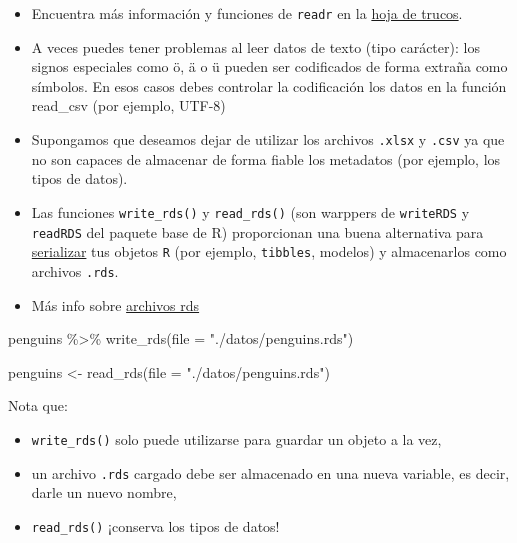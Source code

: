 \documentclass[
  letterpaper,
  DIV=11,
  numbers=noendperiod]{scrreprt}
\newenvironment{Shaded}{\begin{snugshade}}{\end{snugshade}}
\newcommand{\AttributeTok}[1]{\textcolor[rgb]{0.40,0.45,0.13}{#1}}
\newcommand{\FunctionTok}[1]{\textcolor[rgb]{0.28,0.35,0.67}{#1}}
\newcommand{\NormalTok}[1]{\textcolor[rgb]{0.00,0.23,0.31}{#1}}
\newcommand{\OtherTok}[1]{\textcolor[rgb]{0.00,0.23,0.31}{#1}}
\newcommand{\SpecialCharTok}[1]{\textcolor[rgb]{0.37,0.37,0.37}{#1}}
\newcommand{\StringTok}[1]{\textcolor[rgb]{0.13,0.47,0.30}{#1}}
\begin{document}
\begin{itemize}
\item
  Encuentra más información y funciones de \texttt{readr} en la
  \href{https://raw.githubusercontent.com/rstudio/cheatsheets/master/data-import.pdf}{hoja
  de trucos}.
\item
  A veces puedes tener problemas al leer datos de texto (tipo carácter):
  los signos especiales como ö, ä o ü pueden ser codificados de forma
  extraña como símbolos. En esos casos debes controlar la codificación
  los datos en la función read\_csv (por ejemplo, UTF-8)
\item
  Supongamos que deseamos dejar de utilizar los archivos \texttt{.xlsx}
  y \texttt{.csv} ya que no son capaces de almacenar de forma fiable los
  metadatos (por ejemplo, los tipos de datos).
\item
  Las funciones \texttt{write\_rds()} y \texttt{read\_rds()} (son
  warppers de \texttt{writeRDS} y \texttt{readRDS} del paquete base de
  R) proporcionan una buena alternativa para
  \href{https://en.wikipedia.org/wiki/Serialization}{serializar} tus
  objetos \texttt{R} (por ejemplo, \texttt{tibbles}, modelos) y
  almacenarlos como archivos \texttt{.rds}.
\item
  Más info sobre
  \href{https://mgimond.github.io/ES218/Week02b.html\#Export_to_a_Rds_file}{archivos
  rds}
\end{itemize}

\begin{Shaded}
\begin{Highlighting}[]
\NormalTok{penguins }\SpecialCharTok{\%\textgreater{}\%} 
  \FunctionTok{write\_rds}\NormalTok{(}\AttributeTok{file =} \StringTok{"./datos/penguins.rds"}\NormalTok{)}
\end{Highlighting}
\end{Shaded}

\begin{Shaded}
\begin{Highlighting}[]
\NormalTok{penguins }\OtherTok{\textless{}{-}} \FunctionTok{read\_rds}\NormalTok{(}\AttributeTok{file =} \StringTok{"./datos/penguins.rds"}\NormalTok{)}
\end{Highlighting}
\end{Shaded}

Nota que:

\begin{itemize}
\item
  \texttt{write\_rds()} solo puede utilizarse para guardar un objeto a
  la vez,
\item
  un archivo \texttt{.rds} cargado debe ser almacenado en una nueva
  variable, es decir, darle un nuevo nombre,
\item
  \texttt{read\_rds()} ¡conserva los tipos de datos!
\end{itemize}
\end{document}
